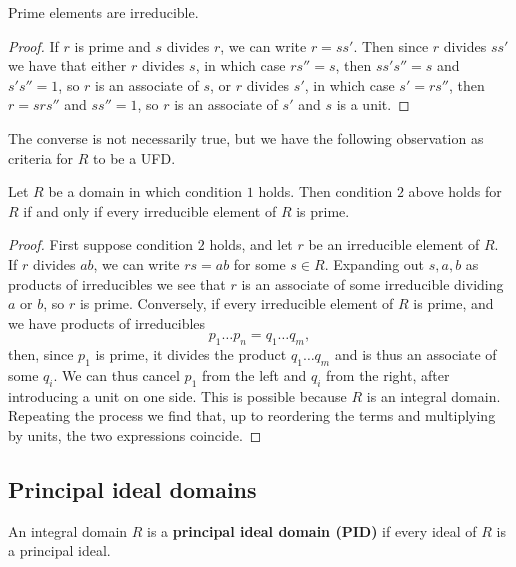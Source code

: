 \begin{lemma}
Prime elements are irreducible.
\end{lemma}

\begin{proof}
If $ r $ is prime and $ s $ divides $ r $, we can write $ r = ss' $. Then since $ r $ divides $ ss' $ we have that either $ r $ divides $ s $, in which case $ rs'' = s $, then $ ss's'' = s $ and $ s's'' = 1 $, so $ r $ is an associate of $ s $, or $ r $ divides $ s' $, in which case $ s' = rs'' $, then $ r = srs'' $ and $ ss'' = 1 $, so $ r $ is an associate of $ s' $ and $ s $ is a unit.
\end{proof}

The converse is not necessarily true, but we have the following observation as criteria for $ R $ to be a UFD.

\begin{proposition}
Let $ R $ be a domain in which condition $ 1 $ holds. Then condition $ 2 $ above holds for $ R $ if and only if every irreducible element of $ R $ is prime.
\end{proposition}

\begin{proof}
First suppose condition $ 2 $ holds, and let $ r $ be an irreducible element of $ R $. If $ r $ divides $ ab $, we can write $ rs = ab $ for some $ s \in R $. Expanding out $ s, a, b $ as products of irreducibles we see that $ r $ is an associate of some irreducible dividing $ a $ or $ b $, so $ r $ is prime. Conversely, if every irreducible element of $ R $ is prime, and we have products of irreducibles
$$ p_1 \dots p_n = q_1 \dots q_m, $$
then, since $ p_1 $ is prime, it divides the product $ q_1 \dots q_m $ and is thus an associate of some $ q_i $. We can thus cancel $ p_1 $ from the left and $ q_i $ from the right, after introducing a unit on one side. This is possible because $ R $ is an integral domain. Repeating the process we find that, up to reordering the terms and multiplying by units, the two expressions coincide.
\end{proof}

\subsection{Principal ideal domains}

\begin{definition}
An integral domain $ R $ is a \textbf{principal ideal domain (PID)} if every ideal of $ R $ is a principal ideal.
\end{definition}

